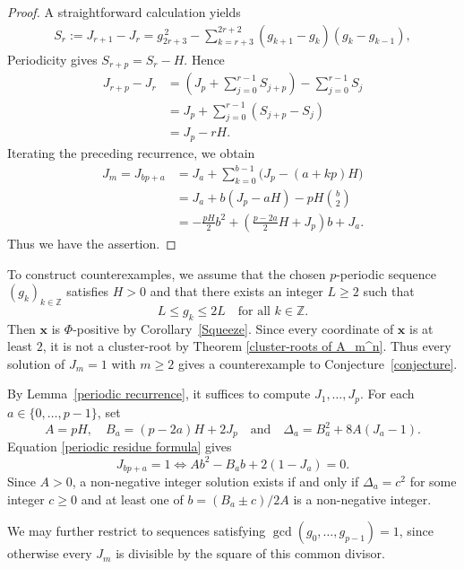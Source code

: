 \documentclass[11pt,a4paper]{amsart}
\theoremstyle{definition}
\numberwithin{equation}{section}
\newcommand{\x}{\mathbf{x}}
\newcommand{\0}{\mathbf{0}}
\begin{document}
	\begin{proof}
		A straightforward calculation yields 
		\begin{align}	\label{S_r}	
		S_r:=J_{r+1}-J_r
		=
		g_{2r+3}^{\,2}
		-\sum_{k=r+3}^{2r+2}(g_{k+1}-g_k)(g_k-g_{k-1}),
	\end{align}
		Periodicity gives $S_{r+p}=S_r-H$.
		Hence
		$$
		\begin{aligned}
		J_{r+p}-J_r
		&=(J_p+\sum_{j=0}^{r-1}S_{j+p})-\sum_{j=0}^{r-1}S_j\\
		&=J_p+\sum_{j=0}^{r-1}(S_{j+p}-S_j)\\
		&=J_p-rH.
		\end{aligned}
		$$
		 Iterating the preceding recurrence, we obtain  
		 \[
		 \begin{aligned}
		 J_m=	J_{bp+a}
		 	&=J_a+\sum_{k=0}^{b-1}
		 	\bigl(J_p-(a+k p)H\bigr)\\
		 	&=J_a+b(J_p-aH)-pH\binom{b}{2}\\
		 	&=-\frac{pH}{2}b^2
		 	+\left(\frac{p-2a}{2}H+J_p\right)b+J_a.
		 \end{aligned}
		 \] Thus we have the assertion.
	\end{proof}


	
		To construct counterexamples, we assume that the chosen $p$-periodic sequence $(g_k)_{k\in\mathbb Z}$ satisfies $H>0$ and that there exists an
		integer $L\ge2$ such that
		\[
		L\le g_k\le2L
		\quad\text{for all }k\in\mathbb Z.
		\] 
	Then $\x$ is $\Phi$-positive by Corollary~\ref{Squeeze}.
	Since every coordinate of $\x$ is at least $2$,
	it is not a cluster-root by
	Theorem \ref{cluster-roots of A_m^n}.
	Thus every solution of $J_m=1$ with $m\ge2$ gives a counterexample to Conjecture~\ref{conjecture}.
	
	By Lemma~\ref{periodic recurrence}, it suffices to compute
	$J_1,\dots,J_p$.
	For each $a\in\{0,\dots,p-1\}$, set
	\[
	A=pH,\quad
	B_a=(p-2a)H+2J_p\quad\text{and}\quad
	\Delta_a=B_a^2+8A(J_a-1).
	\]
	Equation \eqref{periodic residue formula} gives
	\[
	J_{bp+a}=1
	\iff
	Ab^2-B_ab+2(1-J_a)=0.
	\]
	Since $A>0$, a non-negative integer solution exists if and only if
	$\Delta_a=c^2$ for some integer $c\ge0$ and at least one of
	$
	b=(B_a\pm c)/{2A}
	$ 
	is a non-negative integer.
	
	
	We may further restrict to sequences satisfying
	$\gcd(g_0,\dots,g_{p-1})=1$, since otherwise every $J_m$
	is divisible by the square of this common divisor.
	
\end{document}
